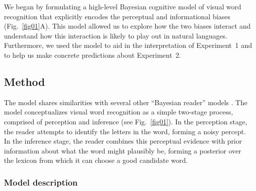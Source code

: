 \documentclass[doc,biblatex]{apa7}
\begin{document}
We began by formulating a high-level Bayesian cognitive model of visual word recognition that explicitly encodes the perceptual and informational biases (Fig.~\ref{fig01}A). This model allowed us to explore how the two biases interact and understand how this interaction is likely to play out in natural languages. Furthermore, we used the model to aid in the interpretation of Experiment~1 and to help us make concrete predictions about Experiment~2.

\subsection{Method}

The model shares similarities with several other ``Bayesian reader'' models \parencite{Norris:2006, Norris:2009, SmithChan:2010, Bicknell:2012, Norris:2012, Valdois:2021}. The model conceptualizes visual word recognition as a simple two-stage process, comprised of perception and inference (see Fig.~\ref{fig01}). In the perception stage, the reader attempts to identify the letters in the word, forming a noisy percept. In the inference stage, the reader combines this perceptual evidence with prior information about what the word might plausibly be, forming a posterior over the lexicon from which it can choose a good candidate word.

\subsubsection{Model description}
\end{document}
